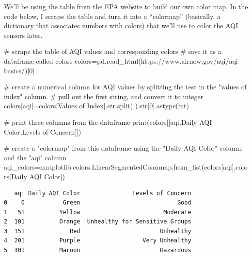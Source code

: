 \documentclass[
  letterpaper,
  DIV=11,
  numbers=noendperiod]{scrreprt}
\newenvironment{Shaded}{\begin{snugshade}}{\end{snugshade}}
\newcommand{\BuiltInTok}[1]{\textcolor[rgb]{0.00,0.23,0.31}{#1}}
\newcommand{\CommentTok}[1]{\textcolor[rgb]{0.37,0.37,0.37}{#1}}
\newcommand{\DecValTok}[1]{\textcolor[rgb]{0.68,0.00,0.00}{#1}}
\newcommand{\NormalTok}[1]{\textcolor[rgb]{0.00,0.23,0.31}{#1}}
\newcommand{\OperatorTok}[1]{\textcolor[rgb]{0.37,0.37,0.37}{#1}}
\newcommand{\StringTok}[1]{\textcolor[rgb]{0.13,0.47,0.30}{#1}}
\begin{document}
We'll be using the table from the EPA website to build our own color
map. In the code below, I scrape the table and turn it into a
``colormap'' (basically, a dictionary that associates numbers with
colors) that we'll use to color the AQI sensors later.

\begin{Shaded}
\begin{Highlighting}[]
\CommentTok{\# scrape the table of AQI values and corresponding colors }
\CommentTok{\# save it as a dataframe called colors}
\NormalTok{colors}\OperatorTok{=}\NormalTok{pd.read\_html(}\StringTok{\textquotesingle{}https://www.airnow.gov/aqi/aqi{-}basics/\textquotesingle{}}\NormalTok{)[}\DecValTok{0}\NormalTok{]}

\CommentTok{\# create a numerical column for AQI values by splitting the test in the "values of index" column. }
\CommentTok{\# pull out the first string, and convert it to integer}
\NormalTok{colors[}\StringTok{\textquotesingle{}aqi\textquotesingle{}}\NormalTok{]}\OperatorTok{=}\NormalTok{colors[}\StringTok{\textquotesingle{}Values of Index\textquotesingle{}}\NormalTok{].}\BuiltInTok{str}\NormalTok{.split(}\StringTok{\textquotesingle{} \textquotesingle{}}\NormalTok{).}\BuiltInTok{str}\NormalTok{[}\DecValTok{0}\NormalTok{].astype(}\BuiltInTok{int}\NormalTok{)}

\CommentTok{\# print three columns from the dataframe }
\BuiltInTok{print}\NormalTok{(colors[[}\StringTok{\textquotesingle{}aqi\textquotesingle{}}\NormalTok{,}\StringTok{\textquotesingle{}Daily AQI Color\textquotesingle{}}\NormalTok{,}\StringTok{\textquotesingle{}Levels of Concern\textquotesingle{}}\NormalTok{]])}

\CommentTok{\# create a "colormap" from this dataframe using the "Daily AQI Color" column, and the "aqi" column }
\NormalTok{aqi\_colors}\OperatorTok{=}\NormalTok{matplotlib.colors.LinearSegmentedColormap.from\_list(colors[}\StringTok{\textquotesingle{}aqi\textquotesingle{}}\NormalTok{],colors[}\StringTok{\textquotesingle{}Daily AQI Color\textquotesingle{}}\NormalTok{])}
\end{Highlighting}
\end{Shaded}

\begin{verbatim}
   aqi Daily AQI Color               Levels of Concern
0    0           Green                            Good
1   51          Yellow                        Moderate
2  101          Orange  Unhealthy for Sensitive Groups
3  151             Red                       Unhealthy
4  201          Purple                  Very Unhealthy
5  301          Maroon                       Hazardous
\end{verbatim}
\end{document}
